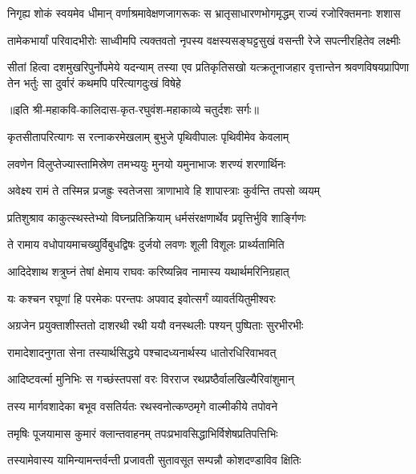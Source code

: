 \fourlineindentedshloka
{निगृह्य शोकं स्वयमेव धीमान्}
{वर्णाश्रमावेक्षणजागरूकः}
{स भ्रातृसाधारणभोगमृद्धम्}
{राज्यं रजोरिक्तमनाः शशास} %

\fourlineindentedshloka
{तामेकभार्यां परिवादभीरोः}
{साध्वीमपि त्यक्तवतो नृपस्य}
{वक्षस्यसङ्घट्टसुखं वसन्ती}
{रेजे सपत्नीरहितेव लक्ष्मीः} %

\fourlineindentedshloka
{सीतां हित्वा दशमुखरिपुर्नोपमेये यदन्याम्}
{तस्या एव प्रतिकृतिसखो यत्क्रतूनाजहार}
{वृत्तान्तेन श्रवणविषयप्रापिणा तेन भर्तुः}
{सा दुर्वारं कथमपि परित्यागदुःखं विषेहे} %

॥इति श्री-महाकवि-कालिदास-कृत-रघुवंश-महाकाव्ये चतुर्दशः सर्गः॥

\twolineshloka
{कृतसीतापरित्यागः स रत्नाकरमेखलाम्}
{बुभुजे पृथिवीपालः पृथिवीमेव केवलाम्} %

\twolineshloka
{लवणेन विलुप्तेज्यास्तामिस्रेण तमभ्ययुः}
{मुनयो यमुनाभाजः शरण्यं शरणार्थिनः} %

\twolineshloka
{अवेक्ष्य रामं ते तस्मिन्न प्रजह्रुः स्वतेजसा}
{त्राणाभावे हि शापास्त्राः कुर्वन्ति तपसो व्ययम्} %

\twolineshloka
{प्रतिशुश्राव काकुत्स्थस्तेभ्यो विघ्नप्रतिक्रियाम्}
{धर्मसंरक्षणार्थेव प्रवृत्तिर्भुवि शार्ङ्गिणः} %

\twolineshloka
{ते रामाय वधोपायमाचख्युर्विबुधद्विषः}
{दुर्जयो लवणः शूली विशूलः प्रार्थ्यतामिति} %

\twolineshloka
{आदिदेशाथ शत्रुघ्नं तेषां क्षेमाय राघवः}
{करिष्यन्निव नामास्य यथार्थमरिनिग्रहात्} %

\twolineshloka
{यः कश्चन रघूणां हि परमेकः परन्तपः}
{अपवाद इवोत्सर्गं व्यावर्तयितुमीश्वरः} %

\twolineshloka
{अग्रजेन प्रयुक्ताशीस्ततो दाशरथी रथी}
{ययौ वनस्थलीः पश्यन् पुष्पिताः सुरभीरभीः} %

\twolineshloka
{रामादेशादनुगता सेना तस्यार्थसिद्धये}
{पश्चादध्यनार्थस्य धातोरधिरिवाभवत्} %

\twolineshloka
{आदिष्टवर्त्मा मुनिभिः स गच्छंस्तपसां वरः}
{विरराज रथप्रष्ठैर्वालखिल्यैरिवांशुमान्} %

\twolineshloka
{तस्य मार्गवशादेका बभूव वसतिर्यतः}
{रथस्वनोत्कण्ठमृगे वाल्मीकीये तपोवने} %

\twolineshloka
{तमृषिः पूजयामास कुमारं क्लान्तवाहनम्}
{तपःप्रभावसिद्धाभिर्विशेषप्रतिपत्तिभिः} %

\twolineshloka
{तस्यामेवास्य यामिन्यामन्तर्वन्ती प्रजावती}
{सुतावसूत सम्पन्नौ कोशदण्डाविव क्षितिः} %

